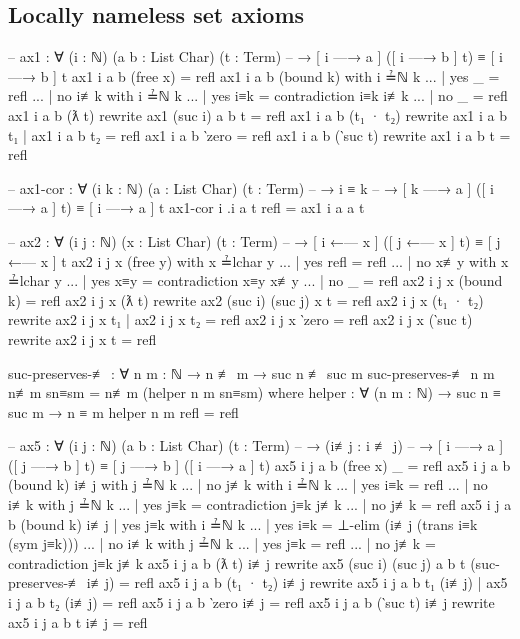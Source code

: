 \documentclass[logo,bsc,singlespacing,parskip,online]{infthesis}
\renewenvironment{code}{\mintedcopy[breaklines,breaksymbolleft=\;]{agda}}{\endmintedcopy}
\begin{document}
\subsection{Locally nameless set axioms}
\begin{code}
-- ax1 : ∀ (i : ℕ) (a b : List Char) (t : Term)
--   → [ i —→ a ] ([ i —→ b ] t) ≡ [ i —→ b ] t
ax1 i a b (free x) = refl
ax1 i a b (bound k) with i ≟ℕ k
... | yes _   = refl
... | no  i≢k with i ≟ℕ k
...   | yes i≡k = contradiction i≡k i≢k
...   | no  _   = refl
ax1 i a b (ƛ t) rewrite ax1 (suc i) a b t = refl
ax1 i a b (t₁ · t₂) rewrite ax1 i a b t₁ | ax1 i a b t₂ = refl
ax1 i a b ‵zero = refl
ax1 i a b (‵suc t) rewrite ax1 i a b t = refl

-- ax1-cor : ∀ (i k : ℕ) (a : List Char) (t : Term)
--   → i ≡ k
--   → [ k —→ a ] ([ i —→ a ] t) ≡ [ i —→ a ] t
ax1-cor i .i a t refl = ax1 i a a t

-- ax2 : ∀ (i j : ℕ) (x : List Char) (t : Term)
--   → [ i ←— x ] ([ j ←— x ] t) ≡ [ j ←— x ] t
ax2 i j x (free y) with x ≟lchar y
... | yes refl = refl
... | no  x≢y with x ≟lchar y
...   | yes x≡y = contradiction x≡y x≢y
...   | no  _   = refl
ax2 i j x (bound k) = refl
ax2 i j x (ƛ t) rewrite ax2 (suc i) (suc j) x t = refl
ax2 i j x (t₁ · t₂) rewrite ax2 i j x t₁ | ax2 i j x t₂ = refl
ax2 i j x ‵zero = refl
ax2 i j x (‵suc t) rewrite ax2 i j x t = refl

suc-preserves-≢ : ∀ {n m : ℕ} → n ≢ m → suc n ≢ suc m
suc-preserves-≢ {n} {m} n≢m sn≡sm = n≢m (helper n m sn≡sm)
  where
    helper : ∀ (n m : ℕ) → suc n ≡ suc m → n ≡ m
    helper n m refl = refl

-- ax5 : ∀ (i j : ℕ) (a b : List Char) (t : Term)
--   → (i≢j : i ≢ j)
--   → [ i —→ a ] ([ j —→ b ] t) ≡ [ j —→ b ] ([ i —→ a ] t)
ax5 i j a b (free x) _ = refl
ax5 i j a b (bound k) i≢j with j ≟ℕ k
... | no  j≢k with i ≟ℕ k
...   | yes i≡k = refl
...   | no  i≢k with j ≟ℕ k
...     | yes j≡k = contradiction j≡k j≢k
...     | no  j≢k = refl
ax5 i j a b (bound k) i≢j | yes j≡k with i ≟ℕ k
...   | yes i≡k = ⊥-elim (i≢j (trans i≡k (sym j≡k)))
...   | no  i≢k with j ≟ℕ k
...     | yes j≡k = refl
...     | no  j≢k = contradiction j≡k j≢k
ax5 i j a b (ƛ t) i≢j
  rewrite ax5 (suc i) (suc j) a b t (suc-preserves-≢ i≢j) = refl
ax5 i j a b (t₁ · t₂) i≢j
  rewrite ax5 i j a b t₁ (i≢j) | ax5 i j a b t₂ (i≢j) = refl
ax5 i j a b ‵zero i≢j = refl
ax5 i j a b (‵suc t) i≢j rewrite ax5 i j a b t i≢j = refl
\end{code}
\end{document}
